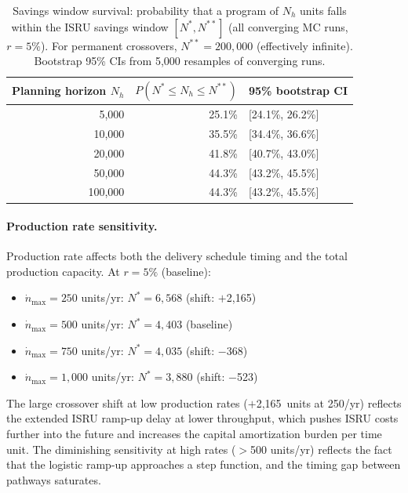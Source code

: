 \documentclass[preprint,12pt]{elsarticle}
\begin{document}
\begin{table}[htbp]
\centering
\caption{Savings window survival: probability that a program of $N_h$ units falls within the ISRU savings window $[N^*, N^{**}]$ (all converging MC runs, $r = 5\%$). For permanent crossovers, $N^{**} = 200{,}000$ (effectively infinite). Bootstrap 95\% CIs from 5{,}000 resamples of converging runs.}
\label{tab:savings_survival}
\small
\begin{tabular}{@{}rrl@{}}
\toprule
Planning horizon $N_h$ & $P(N^* \leq N_h \leq N^{**})$ & 95\% bootstrap CI \\
\midrule
5{,}000   & 25.1\% & [24.1\%, 26.2\%] \\
10{,}000  & 35.5\% & [34.4\%, 36.6\%] \\
20{,}000  & 41.8\% & [40.7\%, 43.0\%] \\
50{,}000  & 44.3\% & [43.2\%, 45.5\%] \\
100{,}000 & 44.3\% & [43.2\%, 45.5\%] \\
\bottomrule
\end{tabular}
\end{table}

\paragraph{Production rate sensitivity.} Production rate affects both the delivery schedule timing and the total production capacity. At $r = 5\%$ (baseline):

\begin{itemize}
\item $\dot{n}_{\max} = 250$ units/yr: $N^* = 6{,}568$ (shift: $+$2{,}165)
\item $\dot{n}_{\max} = 500$ units/yr: $N^* = 4{,}403$ (baseline)
\item $\dot{n}_{\max} = 750$ units/yr: $N^* = 4{,}035$ (shift: $-$368)
\item $\dot{n}_{\max} = 1{,}000$ units/yr: $N^* = 3{,}880$ (shift: $-$523)
\end{itemize}

The large crossover shift at low production rates ($+$2{,}165~units at 250/yr) reflects the extended ISRU ramp-up delay at lower throughput, which pushes ISRU costs further into the future and increases the capital amortization burden per time unit. The diminishing sensitivity at high rates ($>$500 units/yr) reflects the fact that the logistic ramp-up approaches a step function, and the timing gap between pathways saturates.
\end{document}

